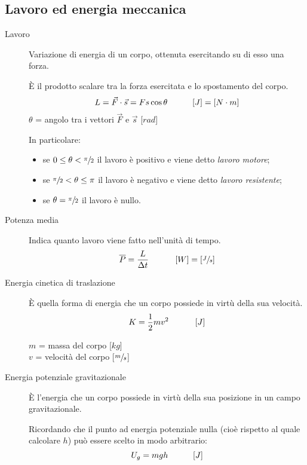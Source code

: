\documentclass[a4paper,11pt,italian]{article}
\begin{document}
\subsection{Lavoro ed energia meccanica}

\begin{description}
  \item[Lavoro] 
  Variazione di energia di un corpo, ottenuta esercitando su di esso una forza.
  
  È il prodotto scalare tra la forza esercitata e lo spostamento del corpo. 
  \[ L = \vec{F} \cdot \vec{s} = F s \cos\theta \hspace*{3em} [J] = [N\cdot m] \]
  $ \theta $ = angolo tra i vettori $ \vec{F} $ e $ \vec{s} $ [$ rad $]
  
  In particolare:\begin{itemize}
    \item se $ 0 \leq \theta < \sfrac{\pi}{2} $ il lavoro è positivo e viene detto \emph{lavoro motore};
    \item se $ \sfrac{\pi}{2} < \theta \leq \pi $ il lavoro è negativo e viene detto \emph{lavoro resistente};
    \item se $ \theta = \sfrac{\pi}{2} $ il lavoro è nullo.
  \end{itemize}
  
  \item[Potenza media] 
  Indica quanto lavoro viene fatto nell'unità di tempo.
  \[ \overline{P} = \frac{L}{\Delta t} \hspace*{3em} \left[ W \right] = \left[ \sfrac{J}{s} \right] \]
  
  \item[Energia cinetica di traslazione] 
  È quella forma di energia che un corpo possiede in virtù della sua velocità.
  \[ K = \frac{1}{2} mv^2 \hspace*{3em} \left[ J \right]\]
  \begin{multicols}{2}
  $ m $ = massa del corpo [$ kg $]\\
  $ v $ = velocità del corpo [$ \sfrac{m}{s} $]
  \end{multicols}
  
  \item[Energia potenziale gravitazionale] 
  È l'energia che un corpo possiede in virtù della sua posizione in un campo gravitazionale.
  
  Ricordando che il punto ad energia potenziale nulla (cioè rispetto al quale calcolare $ h $) può essere scelto in modo arbitrario: 
  \[ U_g = mgh \hspace*{3em} [J] \]
  

\end{description}
\end{document}
